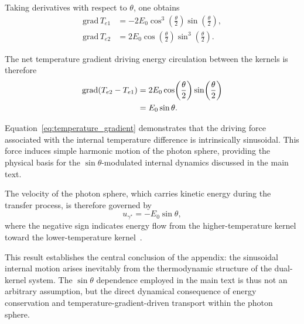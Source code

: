 \documentclass[%
 reprint,
 amsmath,amssymb,
 aps,
 prb,
]{revtex4-2}
\numberwithin{equation}{section}
\begin{document}
Taking derivatives with respect to $\theta$, one obtains
\begin{align}
\mathrm{grad}\, T_{e1}
&= -2E_0 \cos^3\!\left(\frac{\theta}{2}\right)
      \sin\!\left(\frac{\theta}{2}\right), \label{eq:grad_Te1}\\
\mathrm{grad}\, T_{e2}
&=  2E_0 \cos\!\left(\frac{\theta}{2}\right)
      \sin^3\!\left(\frac{\theta}{2}\right). \label{eq:grad_Te2}
\end{align}

The net temperature gradient driving energy circulation between the kernels is therefore
\begin{align}
\mathrm{grad}(T_{e2}-T_{e1})
&= 2E_0 \cos\!\left(\frac{\theta}{2}\right)
       \sin\!\left(\frac{\theta}{2}\right) \notag\\
&= E_0 \sin\theta.
\label{eq:temperature_gradient}
\end{align}

Equation~\eqref{eq:temperature_gradient} demonstrates that the driving force associated with the internal temperature difference is intrinsically sinusoidal. This force induces simple harmonic motion of the photon sphere, providing the physical basis for the $\sin\theta$-modulated internal dynamics discussed in the main text.

The velocity of the photon sphere, which carries kinetic energy during the transfer process, is therefore governed by
\begin{equation}
\boxed{
u_{\gamma^*} = -E_0 \sin\theta,
}
\label{eq:photon_velocity}
\end{equation}
where the negative sign indicates energy flow from the higher-temperature kernel toward the lower-temperature kernel~\cite{hanamura16759284}.

This result establishes the central conclusion of the appendix: the sinusoidal internal motion arises inevitably from the thermodynamic structure of the dual-kernel system. The $\sin\theta$ dependence employed in the main text is thus not an arbitrary assumption, but the direct dynamical consequence of energy conservation and temperature-gradient-driven transport within the photon sphere.


\clearpage

\end{document}
